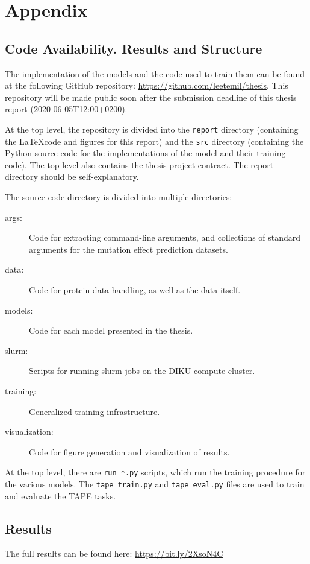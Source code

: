\chapter{Appendix}
\section{Code Availability. Results and Structure}
\label{appendix}
The implementation of the models and the code used to train them can be found at the following GitHub repository: \url{https://github.com/leetemil/thesis}. This repository will be made public soon after the submission deadline of this thesis report (2020-06-05T12:00+0200).

At the top level, the repository is divided into the \texttt{report} directory (containing the \LaTeX code and figures for this report) and the \texttt{src} directory (containing the Python source code for the implementations of the model and their training code). The top level also contains the thesis project contract. The report directory should be self-explanatory.

The source code directory is divided into multiple directories:

\begin{description}
    \item[args:] Code for extracting command-line arguments, and collections of standard arguments for the mutation effect prediction datasets.
    \item[data:] Code for protein data handling, as well as the data itself.
    \item[models:] Code for each model presented in the thesis.
    \item[slurm:] Scripts for running slurm jobs on the DIKU compute cluster.
    \item[training:] Generalized training infrastructure.
    \item[visualization:] Code for figure generation and visualization of results.
\end{description}

At the top level, there are \texttt{run\_*.py} scripts, which run the training procedure for the various models. The \texttt{tape\_train.py} and \texttt{tape\_eval.py} files are used to train and evaluate the TAPE tasks.

\section{Results}
The full results can be found here: \url{https://bit.ly/2XsoN4C}

